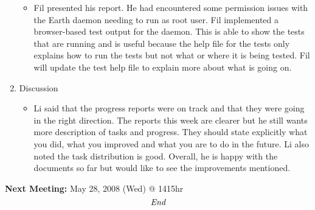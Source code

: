 \documentclass[10pt, a4]{article}
\begin{document}
\begin{enumerate}
\begin{itemize}
		\item Fil presented his report. He had encountered some permission issues with the Earth daemon needing to run as root user. Fil implemented a browser-based test output for the daemon. This is able to show the tests that are running and is useful because the help file for the tests only explains how to run the tests but not what or where it is being tested. Fil will update the test help file to explain more about what is going on.
	\end{itemize}
	\item Discussion
	\begin{itemize}
		\item Li said that the progress reports were on track and that they were going in the right direction. The reports this week are clearer but he still wants more description of tasks and progress. They should state explicitly what you did, what you improved and what you are to do in the future. Li also noted the task distribution is good. Overall, he is happy with the documents so far but would like to see the improvements mentioned.
	\end{itemize}
\end{enumerate}

\textbf{Next Meeting:} May 28, 2008 (Wed) @ 1415hr\\

\[\emph{End}\]
 
\end{document}
